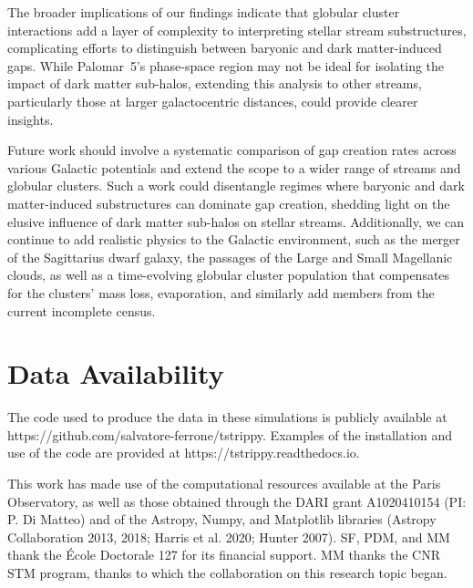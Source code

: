 \documentclass{aa}
\begin{document}
  The broader implications of our findings indicate that globular cluster interactions add a layer of complexity to interpreting stellar stream substructures, complicating efforts to distinguish between baryonic and dark matter-induced gaps. While Palomar~5's phase-space region may not be ideal for isolating the impact of dark matter sub-halos, extending this analysis to other streams, particularly those at larger galactocentric distances, could provide clearer insights. 

  Future work should involve a systematic comparison of gap creation rates across various Galactic potentials and extend the scope to a wider range of streams and globular clusters. Such a work could disentangle regimes where baryonic and dark matter-induced substructures can dominate gap creation, shedding light on the elusive influence of dark matter sub-halos on stellar streams. Additionally, we can continue to add realistic physics to the Galactic environment, such as the merger of the Sagittarius dwarf galaxy, the passages of the Large and Small Magellanic clouds, as well as a time-evolving globular cluster population that compensates for the clusters' mass loss, evaporation, and similarly add members from the current incomplete census.


  
\section*{Data Availability}

  The code used to produce the data in these simulations is publicly available at https://github.com/salvatore-ferrone/tstrippy. Examples of the installation and use of the code are provided at https://tstrippy.readthedocs.io. 



\begin{acknowledgements}
  This work has made use of the computational resources available at the Paris Observatory, as well as those obtained through the DARI grant A1020410154 (PI: P. Di Matteo) and of the Astropy, Numpy, and Matplotlib libraries (Astropy Collaboration 2013, 2018; Harris et al. 2020; Hunter 2007). SF, PDM, and MM thank the École Doctorale 127 for its financial support. MM thanks the CNR STM program, thanks to which the collaboration on this research topic began. 
\end{acknowledgements}




\end{document}
